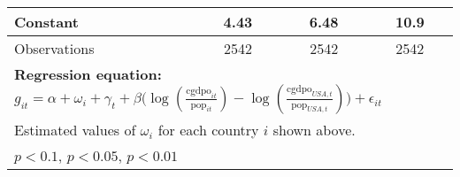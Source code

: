 \begin{sidewaystable}[htbp]
\begin{tabular}{l*{3}{c}}
Constant        &     4.43         &     6.48\sym{**} &     10.9\sym{**} \\
\midrule
Observations    &     2542         &     2542         &     2542         \\
\bottomrule
\multicolumn{4}{l}{\footnotesize \textbf{Regression equation:} \(g_{it} = \alpha  + \omega_i + \gamma_t + \beta \big(\log (\frac{\textrm{cgdpo}_{it}}{\textrm{pop}_{it}} ) - \log (\frac{\textrm{cgdpo}_{USA,t}}{\textrm{pop}_{USA,t}}  ) \big) + \epsilon_{it}\)}\\
\multicolumn{4}{l}{\footnotesize Estimated values of \(\omega_i\) for each country \(i\) shown above.}\\
\multicolumn{4}{l}{\footnotesize \sym{*} \(p<0.1\), \sym{**} \(p<0.05\), \sym{***} \(p<0.01\)}\\
\end{tabular}
\end{sidewaystable}

